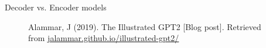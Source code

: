 \documentclass[10pt]{beamer}
\begin{document}
\begin{frame}{Decoder vs. Encoder models}

\begin{figure}[h]
\centering
{}
\caption{Alammar, J (2019). The Illustrated GPT2 [Blog post]. Retrieved from \href{https://jalammar.github.io/illustrated-gpt2/}{jalammar.github.io/illustrated-gpt2/}
}
\end{figure}

\end{frame}
\end{document}

